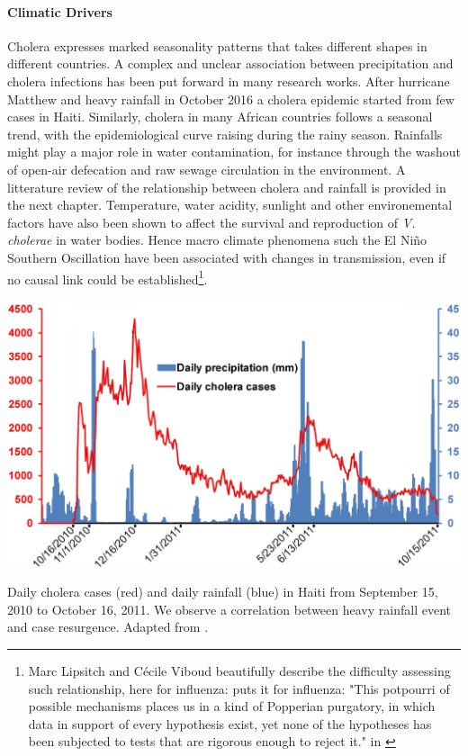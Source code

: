 \paragraph{Climatic Drivers} Cholera expresses marked seasonality patterns that takes different shapes in different countries. A complex and unclear association between precipitation and cholera infections has been put forward in many research works. After hurricane Matthew and heavy rainfall in October 2016 a cholera epidemic started from few cases in Haiti\cite{Rinaldo:Reassessment20102011:2012, Gaudart:SpatioTemporalDynamicsCholera:2013}. Similarly, cholera in many African countries follows a seasonal trend, with the epidemiological curve raising during the rainy season\cite{Baracchini:SeasonalityCholeraDynamics:2017}.  Rainfalls might play a major role in water contamination, for instance through the washout of open-air defecation and raw sewage circulation in the environment. A litterature review of the relationship between cholera and rainfall is provided in the next chapter. Temperature, water acidity, sunlight and other environemental factors have also been shown to affect the survival and reproduction of \textit{V. cholerae} in water bodies. Hence macro climate phenomena such the El Niño Southern Oscillation have been associated with changes in transmission, even if no causal link could be established\cite{Pascual:CholeraDynamicsNinoSouthern:2000}\footnote{Marc Lipsitch and Cécile Viboud beautifully describe the difficulty assessing such relationship, here for influenza:  puts it for influenza: "This potpourri of possible mechanisms places us in a kind of Popperian purgatory, in which data in support of every hypothesis exist, yet none of the hypotheses has been subjected to tests that are rigorous enough to reject it." in \textcite{Lipsitch:InfluenzaSeasonalityLifting:2009}}.
\begin{marginfigure}
\centering
\includegraphics[width=\textwidth]{fig/cholera-rainfall.png}
\caption[Daily cholera cases and rainfall in Haiti]{\footnotesize Daily cholera cases (red) and daily rainfall (blue) in Haiti from September 15, 2010 to October
16, 2011. We observe a correlation between heavy rainfall event and case resurgence. Adapted from .}
\label{rain}
\end{marginfigure}

